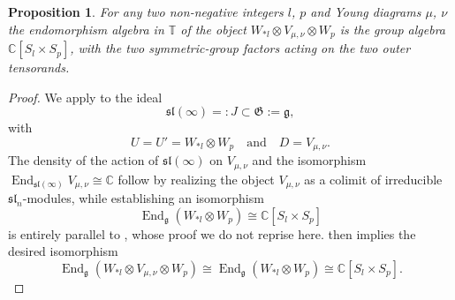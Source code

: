 \documentclass[11pt]{article}
\theoremstyle{plain}
\newtheorem{proposition}[lemma]{Proposition}
\theoremstyle{nonumberplain}
\theoremstyle{plain}
\numberwithin{equation}{section}
\theoremstyle{nonumberplain}
\newtheorem{proof}{Proof}
\newcommand\bC{{\mathbb C}}
\newcommand\bT{{\mathbb T}}
\newcommand\fG{{\mathfrak G}}
\newcommand\fg{{\mathfrak g}}
\newcommand\fsl{\mathfrak{sl}}
\newcommand\1{{\bf 1}}
\DeclareMathOperator{\End}{\mathrm{End}}
\begin{document}
\begin{proposition}\label{pr:gpendoalgs}
  For any two non-negative integers $l$, $p$ and Young diagrams $\mu$, $\nu$ the endomorphism algebra in $\bT$ of the object $W_{*l}\otimes V_{\mu,\nu}\otimes W_{p}$ is the group algebra $\bC [S_l\times S_p]$, with the two symmetric-group factors acting on the two outer tensorands. 
\end{proposition}
\begin{proof}
  We apply  to the ideal
  \begin{equation*}
    \fsl(\infty)=:J\subset \fG:=\fg,
  \end{equation*}
  with
  \begin{equation*}
    U=U'=W_{*l}\otimes W_p\quad\text{and}\quad D=V_{\mu,\nu}. 
  \end{equation*}
  The density of the action of $\fsl(\infty)$ on $V_{\mu,\nu}$ and the isomorphism $\End_{\fsl(\infty)} V_{\mu,\nu}\cong \bC$ follow by realizing the object $V_{\mu,\nu}$ as a colimit of irreducible $\fsl_n$-modules, while establishing an isomorphism
  \begin{equation*}
    \End_{\fg} ( W_{*l}\otimes W_p)\cong \bC[S_l\times S_p]
  \end{equation*}
  is entirely parallel to \cite[Proposition 3.2]{us0}, whose proof we do not reprise here.  then implies the desired isomorphism
  \begin{equation*}
    \End_{\fg} (W_{*l}\otimes V_{\mu,\nu}\otimes W_p)\cong  \End_{\fg} (W_{*l}\otimes W_p)\cong \bC[S_l\times S_p].
  \end{equation*}
\end{proof}
\end{document}
